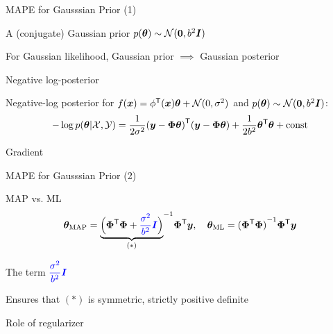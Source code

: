 \documentclass[handout,fleqn,aspectratio=169]{beamer}
\begin{document}
\begin{frame}{MAPE for Gausssian Prior (1)}

\plitemsep 0.07in

\bci 

\item \exam A (conjugate) Gaussian prior $p(\bm{\theta}) \sim \mathcal N(\bm{0}, b^2 \bm{I})$
\bci
\item For Gaussian likelihood, Gaussian prior $\implies$ Gaussian posterior \hfill {}
\eci

\item Negative log-posterior

\medskip
\mycolorbox
{
Negative-log posterior for $f(\bm{x}) = {\phi}^{\mathsf{T}}(\bm{x})\bm{\theta} + \mathcal N(0,\sigma^2)$ and $p(\bm{\theta}) \sim \mathcal N(\bm{0}, b^2 \bm{I})$:
\vspace{-0.1cm}
$$
-\log p(\bm{\theta} | \mathcal X,\mathcal Y) = \frac{1}{2\sigma^2} {(\bm{y} - \bm{\Phi}\bm{\theta})}^{\mathsf{T}} (\bm{y} - \bm{\Phi}\bm{\theta}) + \frac{1}{2b^2}{\bm{\theta}}^{\mathsf{T}}\bm{\theta} + \text{const}
$$
}
\item Gradient

\eci

\end{frame}

\begin{frame}{MAPE for Gausssian Prior (2)}

\plitemsep 0.1in

\bci 

\item MAP vs. ML
$$
\bm{\theta}_{\text{MAP}} = {
\underbrace{\Big({\bm{\Phi}}^{\mathsf{T}} \bm{\Phi} + {\color{blue} \frac{\sigma^2}{b^2}\bm{I}} \Big)}_{(*)}
}^{-1} {\bm{\Phi}}^{\mathsf{T}} \bm{y}, \quad \bm{\theta}_{\text{ML}} = {({\bm{\Phi}}^{\mathsf{T}}\bm{\Phi})}^{-1} {\bm{\Phi}}^{\mathsf{T}} \bm{y}
$$

\item The term ${\color{blue} \dfrac{\sigma^2}{b^2}\bm{I}}$ 
\bci
\item Ensures that $(*)$ is symmetric, strictly positive definite
\item Role of regularizer
\eci
\eci

\end{frame}
\end{document}
